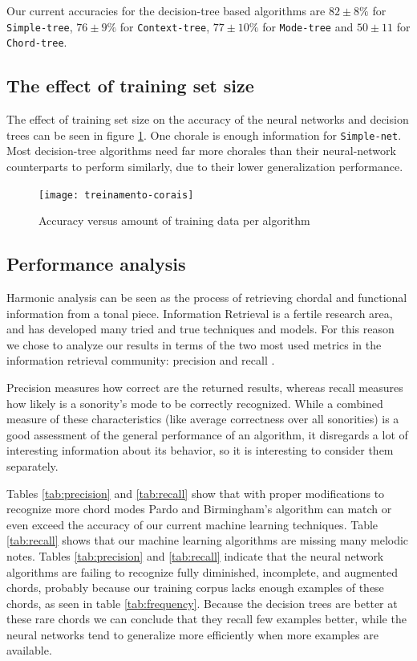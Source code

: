 \documentclass{article}
\begin{document}
Our current accuracies for the decision-tree based algorithms are $82
\pm 8\%$ for \texttt{Simple-tree}, $76 \pm 9\%$ for
\texttt{Context-tree}, $77 \pm 10\%$ for \texttt{Mode-tree} and $50
\pm 11$ for \texttt{Chord-tree}.

\subsection{The effect of training set size}

The effect of training set size on the accuracy of the neural networks
and decision trees can be seen in figure
\ref{fig:treinamento-corais}. One chorale is enough information for
\texttt{Simple-net}. Most decision-tree algorithms need far more
chorales than their neural-network counterparts to perform similarly,
due to their lower generalization performance.

\begin{figure}
  \texttt{[image: treinamento-corais]}
  \caption{Accuracy versus amount of training data per algorithm}
  \label{fig:treinamento-corais}
\end{figure}


\subsection{Performance analysis}
\label{sec:common-errors}

Harmonic analysis can be seen as the process of retrieving chordal and
functional information from a tonal piece. Information Retrieval is a
fertile research area, and has developed many tried and true
techniques and models. For this reason we chose to analyze our results
in terms of the two most used metrics in the information retrieval
community: precision and recall \cite{russell.ea:artificial}.

Precision measures how correct are the returned results, whereas
recall measures how likely is a sonority's mode to be correctly
recognized. While a combined measure of these characteristics (like
average correctness over all sonorities) is a good assessment of the
general performance of an algorithm, it disregards a lot of
interesting information about its behavior, so it is interesting to
consider them separately.

Tables \ref{tab:precision} and \ref{tab:recall} show that with proper
modifications to recognize more chord modes Pardo and Birmingham's
algorithm can match or even exceed the accuracy of our current machine
learning techniques. Table \ref{tab:recall} shows that our machine
learning algorithms are missing many melodic notes. Tables
\ref{tab:precision} and \ref{tab:recall} indicate that the neural
network algorithms are failing to recognize fully diminished,
incomplete, and augmented chords, probably because our training corpus
lacks enough examples of these chords, as seen in table
\ref{tab:frequency}. Because the decision trees are better at these
rare chords we can conclude that they recall few examples better,
while the neural networks tend to generalize more efficiently when
more examples are available.
\end{document}
